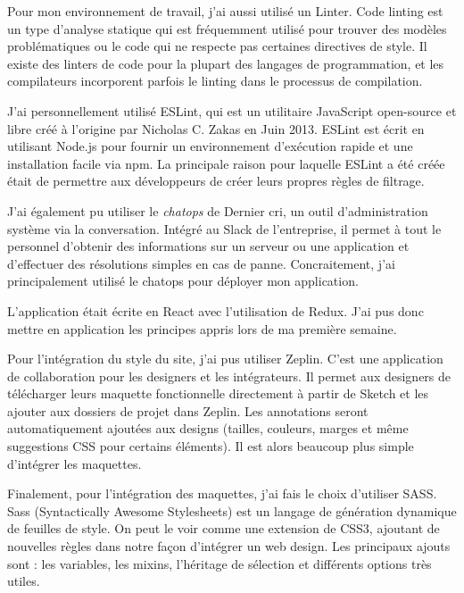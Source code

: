 \bigskip

Pour mon environnement de travail, j'ai aussi utilisé un Linter. Code
linting est un type d'analyse statique qui est fréquemment utilisé pour
trouver des modèles problématiques ou le code qui ne respecte pas
certaines directives de style. Il existe des linters de code pour la
plupart des langages de programmation, et les compilateurs incorporent
parfois le linting dans le processus de compilation.

J'ai personnellement utilisé ESLint, qui est un utilitaire JavaScript
open-source et libre créé à l'origine par Nicholas C. Zakas en Juin
2013. ESLint est écrit en utilisant Node.js pour fournir un
environnement d'exécution rapide et une installation facile via npm. La
principale raison pour laquelle ESLint a été créée était de permettre
aux développeurs de créer leurs propres règles de filtrage.

\bigskip

J'ai également pu utiliser le \emph{chatops} de Dernier cri, un outil
d'administration système via la conversation. Intégré au Slack de
l'entreprise, il permet à tout le personnel d'obtenir des informations
sur un serveur ou une application et d'effectuer des résolutions simples
en cas de panne. Concraitement, j'ai principalement utilisé le chatops
pour déployer mon application.

\bigskip

L'application était écrite en React avec l'utilisation de Redux. J'ai
pus donc mettre en application les principes appris lors de ma première
semaine.

\bigskip

Pour l'intégration du style du site, j'ai pus utiliser Zeplin. C'est une
application de collaboration pour les designers et les intégrateurs. Il
permet aux designers de télécharger leurs maquette fonctionnelle
directement à partir de Sketch et les ajouter aux dossiers de projet
dans Zeplin. Les annotations seront automatiquement ajoutées aux designs
(tailles, couleurs, marges et même suggestions CSS pour certains
éléments). Il est alors beaucoup plus simple d'intégrer les maquettes.

\bigskip

Finalement, pour l'intégration des maquettes, j'ai fais le choix
d'utiliser SASS. Sass (Syntactically Awesome Stylesheets) est un langage
de génération dynamique de feuilles de style. On peut le voir comme une
extension de CSS3, ajoutant de nouvelles règles dans notre façon
d'intégrer un web design. Les principaux ajouts sont : les variables,
les mixins, l'héritage de sélection et différents options très utiles.

